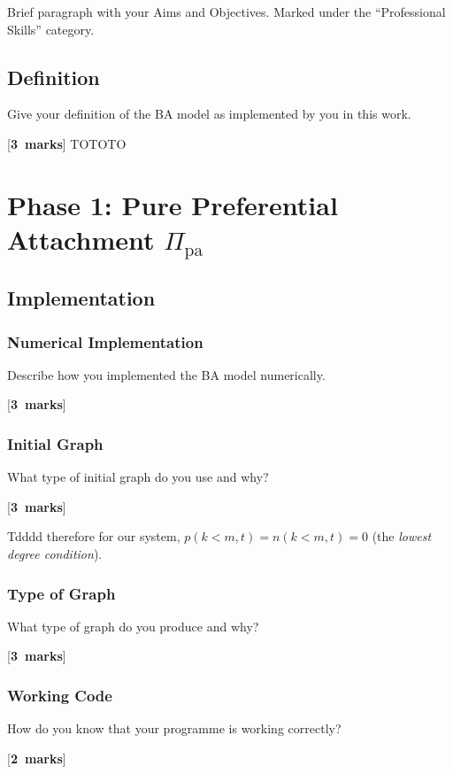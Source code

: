 \documentclass[a4paper,12pt]{article}
\newcounter{nmarks}
\newcommand{\qmarks}[1]{\addtocounter{nmarks}{#1} }
\renewcommand{\qmarks}[1]{\addtocounter{nmarks}{#1} \hspace*{\fill} [\textbf{#1~marks}]}
\begin{document}
Brief paragraph with your Aims and Objectives. Marked under the ``Professional Skills'' category.

\subsection*{Definition}

Give your definition of the BA model as implemented by you in this work. \qmarks{3} TOTOTO


\section{Phase 1: Pure Preferential Attachment $\Pi_\mathrm{pa}$}

\subsection{Implementation}



\subsubsection{Numerical Implementation}
Describe how you implemented the BA model numerically. \qmarks{3} %


\subsubsection{Initial Graph}
What type of initial graph do you use and why? \qmarks{3}

Tdddd therefore for our system, $p(k<m,t)=n(k<m,t)=0$ (the \textit{lowest degree condition}).

\subsubsection{Type of Graph}
What type of graph do you produce and why? \qmarks{3}

\subsubsection{Working Code}
How do you know that your programme is working correctly? \qmarks{2}
\end{document}
